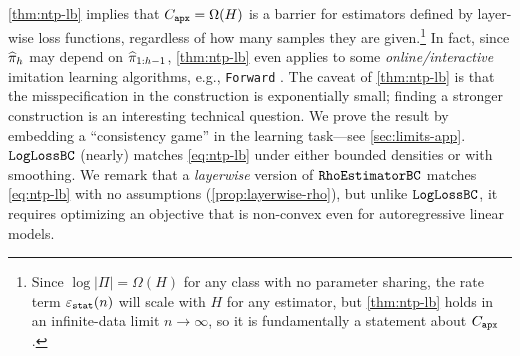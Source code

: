 \cref{thm:ntp-lb} implies that $C_{\texttt{apx}} = \Omega(H)$ is a barrier for estimators defined by layer-wise loss functions, regardless of how many samples they are given.\footnote{Since $\log|\Pi|=\Omega(H)$ for any class with no parameter sharing, the rate term $\varepsilon_{\texttt{stat}}(n)$ will scale with $H$ for any estimator, but \cref{thm:ntp-lb} holds in an infinite-data limit $n \to \infty$, so it is fundamentally a statement about $C_{\texttt{apx}}$.} In fact, since $\widehat{\pi}_h$ may depend on $\widehat{\pi}_{1:h-1}$, \cref{thm:ntp-lb} even applies to some \emph{online/interactive} imitation learning algorithms, e.g., \texttt{Forward} \citep{ross2011reduction}. The caveat of \cref{thm:ntp-lb} is that the misspecification in the construction is exponentially small; finding a stronger construction is an interesting technical question. We prove the result by embedding a ``consistency game'' in the learning task---see \cref{sec:limits-app}.%
\arxiv{ 

}
$\texttt{LogLossBC}$ (nearly) matches \cref{eq:ntp-lb} under either bounded densities or with smoothing. We remark that a \emph{layerwise} version of $\texttt{RhoEstimatorBC}$ matches \cref{eq:ntp-lb} with no assumptions  (\cref{prop:layerwise-rho}), but unlike $\texttt{LogLossBC}$, it requires optimizing an objective that is non-convex even for autoregressive linear models.\loose

